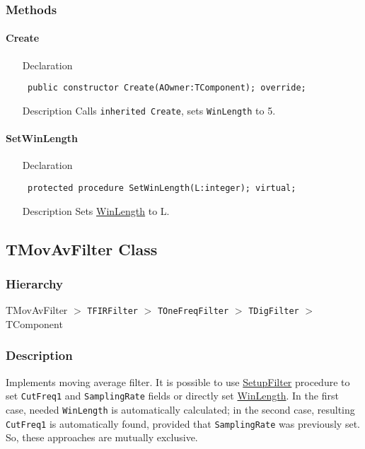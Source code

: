 \documentclass[12pt,a4paper,oneside]{report}
\newcommand{\declarationitem}[1]{{\addfontfeatures{FakeBold=1.3} #1}}
\newcommand{\descriptiontitle}[1]{{\addfontfeatures{FakeSlant}#1}}
\newcommand{\code}[1]{\texttt{#1}}
\begin{document}
\subsubsection{Methods}
\paragraph{Create}\hspace*{\fill}
\label{lmfilters.TFIRFilter-Create}
\begin{itemize}\item[\declarationitem{Declaration}\hfill]
	\begin{flushleft}
		\code{
			public constructor Create(AOwner:TComponent); override;}
	\end{flushleft}
	\item[\descriptiontitle{Description}] Calls \code{inherited Create}, sets \code{WinLength} to 5.
\end{itemize}
\paragraph{SetWinLength}\hspace*{\fill}
\label{lmfilters.TFIRFilter-SetWinLength}
\begin{itemize}\item[\declarationitem{Declaration}\hfill]
	\begin{flushleft}
		\code{
			protected procedure SetWinLength(L:integer); virtual;}
	\end{flushleft}
\item[\descriptiontitle{Description}] Sets \hyperref[lmfilters.TFIRFilter-WinLength]{WinLength} to L.
\end{itemize}
\subsection{TMovAvFilter Class}
\label{lmfilters.TMovAvFilter}
\subsubsection{Hierarchy}
TMovAvFilter {$>$} \code{TFIRFilter} {$>$} \code{TOneFreqFilter} {$>$} \code{TDigFilter} {$>$} 
TComponent
\subsubsection{Description}
Implements moving average filter. It is possible to use \hyperref[lmfilters.TMovAvFilter-SetupFilter]{SetupFilter} procedure to set \code{CutFreq1} and \code{SamplingRate} fields or directly set \hyperref[lmfilters.TFIRFilter-WinLength]{WinLength}. In the first case, needed \code{WinLength} is automatically calculated; in the second case, resulting \code{CutFreq1} is automatically found, provided that \code{SamplingRate} was previously set. So, these approaches are mutually exclusive. 
\end{document}
